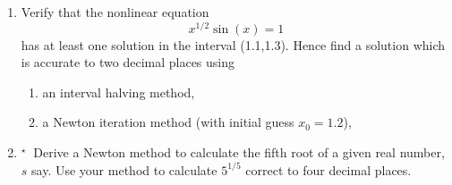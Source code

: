 \documentclass[11pt,a4paper]{article}
\def\tough{$\!\!\!{}^\star\>$}
\begin{document}
 
\begin{enumerate}
\item\label{qdjsn1} 
Verify that the nonlinear equation 
$${x}^{1/2} \sin (x) = 1$$ has at
least one solution in the interval (1.1,1.3). Hence find a solution  
which is accurate to two decimal places using
\begin{enumerate}
\item an interval halving method,
\item a Newton iteration method (with initial guess $x_0 = 1.2$),
\end{enumerate}

%

\item\label{qdjsn2}\tough 
Derive a Newton method to calculate the fifth root of a given real 
number, $s$ say. Use your method to calculate $5^{1/5}$ correct to 
four decimal places.
%

\end{enumerate}

\end{document}
